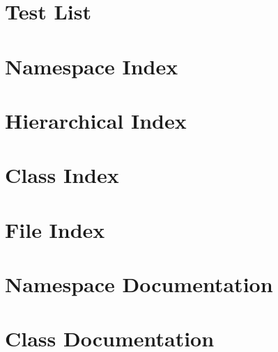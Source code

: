 \let\mypdfximage\pdfximage\def\pdfximage{\immediate\mypdfximage}\documentclass[twoside]{book}
\newcommand{\+}{\discretionary{\mbox{\scriptsize$\hookleftarrow$}}{}{}}
\begin{document}
\chapter{Test List}
\label{test}

\chapter{Namespace Index}

\chapter{Hierarchical Index}

\chapter{Class Index}

\chapter{File Index}

\chapter{Namespace Documentation}

\chapter{Class Documentation}











\end{document}
